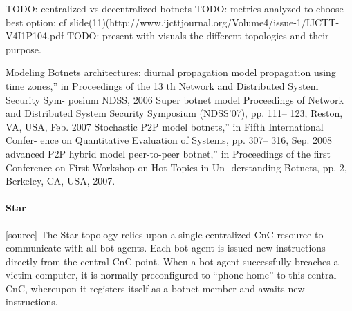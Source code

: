 TODO: centralized vs decentralized botnets
TODO: metrics analyzed to choose best option: cf slide(11)(http://www.ijcttjournal.org/Volume4/issue-1/IJCTT-V4I1P104.pdf
TODO: present with visuals the different topologies and their purpose.

Modeling Botnets architectures:
diurnal propagation model %
propagation using time zones,” in Proceedings of the 13 th Network and Distributed System
Security Sym- posium NDSS, 2006
Super botnet model %
Proceedings of Network and Distributed System Security Symposium (NDSS’07), pp. 111–
123, Reston, VA, USA, Feb. 2007
Stochastic P2P model %
botnets,” in Fifth International Confer- ence on Quantitative Evaluation of Systems, pp. 307–
316, Sep. 2008 %
advanced P2P hybrid model %
peer-to-peer botnet,” in Proceedings of the first Conference on First Workshop on Hot Topics
in Un- derstanding Botnets, pp. 2, Berkeley, CA, USA, 2007.

\paragraph{Star}
[source]
The Star topology relies upon a single centralized CnC resource to communicate with
all bot agents. Each bot agent is issued new instructions directly from the central CnC
point. When a bot agent successfully breaches a victim computer, it is normally
preconfigured to “phone home” to this central CnC, whereupon it registers itself as a
botnet member and awaits new instructions.

